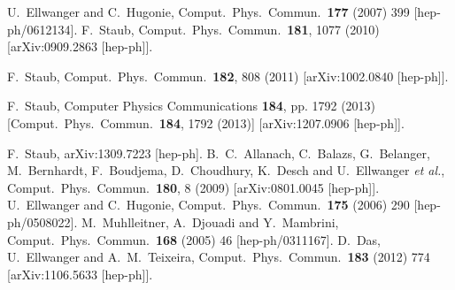 \documentclass[final,3p,times,pdflatex]{elsarticle}
\begin{document}
\begin{thebibliography}{10}
  U.~Ellwanger and C.~Hugonie,
  Comput.\ Phys.\ Commun.\  {\bf 177} (2007) 399
  [hep-ph/0612134].
  F.~Staub,
  Comput.\ Phys.\ Commun.\  {\bf 181}, 1077 (2010)
  [arXiv:0909.2863 [hep-ph]].

  F.~Staub,
  Comput.\ Phys.\ Commun.\  {\bf 182}, 808 (2011)
  [arXiv:1002.0840 [hep-ph]].

  F.~Staub,
  Computer Physics Communications {\bf 184}, pp. 1792 (2013)
  [Comput.\ Phys.\ Commun.\  {\bf 184}, 1792 (2013)]
  [arXiv:1207.0906 [hep-ph]].

  F.~Staub,
  arXiv:1309.7223 [hep-ph].
  B.~C.~Allanach, C.~Balazs, G.~Belanger, M.~Bernhardt, F.~Boudjema, D.~Choudhury, K.~Desch and U.~Ellwanger {\it et al.},
  Comput.\ Phys.\ Commun.\  {\bf 180}, 8 (2009)
  [arXiv:0801.0045 [hep-ph]].
  U.~Ellwanger and C.~Hugonie,
  Comput.\ Phys.\ Commun.\  {\bf 175} (2006) 290
  [hep-ph/0508022].
  M.~Muhlleitner, A.~Djouadi and Y.~Mambrini,
  Comput.\ Phys.\ Commun.\  {\bf 168} (2005) 46
  [hep-ph/0311167].
  D.~Das, U.~Ellwanger and A.~M.~Teixeira,
  Comput.\ Phys.\ Commun.\  {\bf 183} (2012) 774
  [arXiv:1106.5633 [hep-ph]].


\end{thebibliography}
\end{document}
